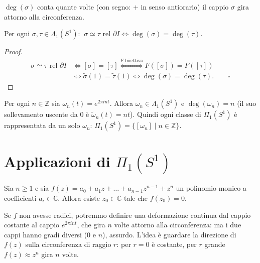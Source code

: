 \begin{intuizione}
$\deg(\sigma)$ conta quante volte (con segno: $+$ in senso antiorario) il cappio $\sigma$ gira attorno alla circonferenza.
\end{intuizione}

\begin{prop}
Per ogni $\sigma, \tau \in \Lambda_1(S^1)$: $\ \sigma \simeq \tau \text{ rel } \partial I \iff \deg(\sigma) = \deg(\tau)$.
\end{prop}
\begin{proof}
\[
\begin{aligned}
\sigma \simeq \tau \text{ rel } \partial I &\iff [\sigma] = [\tau] \overset{F \text{ biiettiva}}{\iff} F([\sigma]) = F([\tau]) \\
&\iff \widetilde{\sigma}(1) = \widetilde{\tau}(1) \iff \deg(\sigma) = \deg(\tau). \qquad \square
\end{aligned}
\]
\end{proof}

\begin{observacion}
Per ogni $n \in \mathbb{Z}$ sia $\omega_n(t) = e^{2\pi i n t}$. Allora $\omega_n \in \Lambda_1(S^1)$ e $\deg(\omega_n) = n$ (il suo sollevamento uscente da $0$ \`e $\widetilde{\omega}_n(t) = nt$). Quindi ogni classe di $\Pi_1(S^1)$ \`e rappresentata da un solo $\omega_n$: $\Pi_1(S^1) = \{ [\omega_n] \mid n \in \mathbb{Z} \}$.
\end{observacion}


\section{Applicazioni di $\Pi_1(S^1)$}

\begin{teo}
Sia $n \geqslant 1$ e sia $f(z) = a_0 + a_1 z + \dots + a_{n-1} z^{n-1} + z^n$ un polinomio monico a coefficienti $a_i \in \mathbb{C}$. Allora esiste $z_0 \in \mathbb{C}$ tale che $f(z_0) = 0$.
\end{teo}

\begin{intuizione}
Se $f$ non avesse radici, potremmo definire una deformazione continua dal cappio costante al cappio $e^{2\pi i n t}$, che gira $n$ volte attorno alla circonferenza: ma i due cappi hanno gradi diversi ($0$ e $n$), assurdo. L'idea \`e guardare la direzione di $f(z)$ sulla circonferenza di raggio $r$: per $r = 0$ \`e costante, per $r$ grande $f(z) \approx z^n$ gira $n$ volte.
\end{intuizione}

